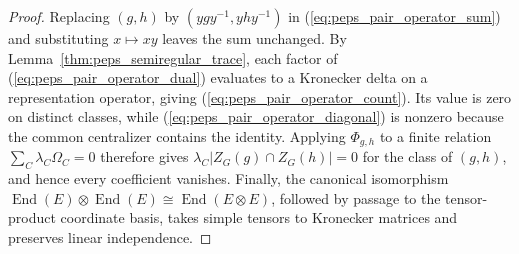 \begin{proof}\leanok
    Replacing $(g,h)$ by $(ygy^{-1},yhy^{-1})$ in
    (\ref{eq:peps_pair_operator_sum}) and substituting $x\mapsto xy$
    leaves the sum unchanged. By Lemma~\ref{thm:peps_semiregular_trace},
    each factor of (\ref{eq:peps_pair_operator_dual}) evaluates to a
    Kronecker delta on a representation operator, giving
    (\ref{eq:peps_pair_operator_count}). Its value is zero on distinct
    classes, while (\ref{eq:peps_pair_operator_diagonal}) is nonzero
    because the common centralizer contains the identity. Applying
    $\Phi_{g,h}$ to a finite relation $\sum_C\lambda_C\Omega_C=0$
    therefore gives $\lambda_C|Z_G(g)\cap Z_G(h)|=0$ for the class of
    $(g,h)$, and hence every coefficient vanishes. Finally, the canonical
    isomorphism
    $\operatorname{End}(E)\otimes\operatorname{End}(E)
        \cong\operatorname{End}(E\otimes E)$, followed by passage to the
    tensor-product coordinate basis, takes simple tensors to Kronecker
    matrices and preserves linear independence.
\end{proof}
